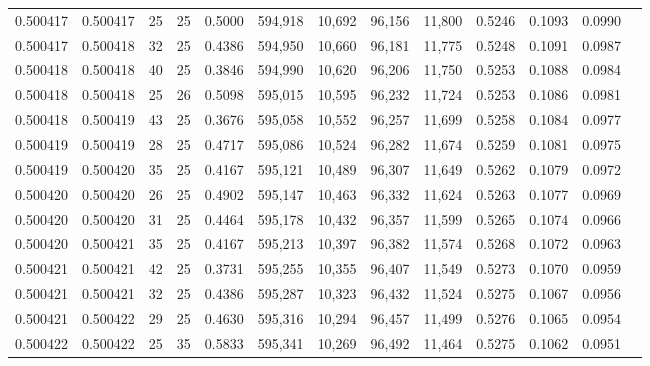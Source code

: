 \begin{tabular}{rrrrrrrrrrrrr}
0.500417 & 0.500417 &    25 &  25 &                                     0.5000 & 594,918 &  10,692 &  96,156 &  11,800 & 0.5246 & 0.1093 & 0.0990 \\
0.500417 & 0.500418 &    32 &  25 &                                     0.4386 & 594,950 &  10,660 &  96,181 &  11,775 & 0.5248 & 0.1091 & 0.0987 \\
0.500418 & 0.500418 &    40 &  25 &                                     0.3846 & 594,990 &  10,620 &  96,206 &  11,750 & 0.5253 & 0.1088 & 0.0984 \\
0.500418 & 0.500418 &    25 &  26 &                                     0.5098 & 595,015 &  10,595 &  96,232 &  11,724 & 0.5253 & 0.1086 & 0.0981 \\
0.500418 & 0.500419 &    43 &  25 &                                     0.3676 & 595,058 &  10,552 &  96,257 &  11,699 & 0.5258 & 0.1084 & 0.0977 \\
0.500419 & 0.500419 &    28 &  25 &                                     0.4717 & 595,086 &  10,524 &  96,282 &  11,674 & 0.5259 & 0.1081 & 0.0975 \\
0.500419 & 0.500420 &    35 &  25 &                                     0.4167 & 595,121 &  10,489 &  96,307 &  11,649 & 0.5262 & 0.1079 & 0.0972 \\
0.500420 & 0.500420 &    26 &  25 &                                     0.4902 & 595,147 &  10,463 &  96,332 &  11,624 & 0.5263 & 0.1077 & 0.0969 \\
0.500420 & 0.500420 &    31 &  25 &                                     0.4464 & 595,178 &  10,432 &  96,357 &  11,599 & 0.5265 & 0.1074 & 0.0966 \\
0.500420 & 0.500421 &    35 &  25 &                                     0.4167 & 595,213 &  10,397 &  96,382 &  11,574 & 0.5268 & 0.1072 & 0.0963 \\
0.500421 & 0.500421 &    42 &  25 &                                     0.3731 & 595,255 &  10,355 &  96,407 &  11,549 & 0.5273 & 0.1070 & 0.0959 \\
0.500421 & 0.500421 &    32 &  25 &                                     0.4386 & 595,287 &  10,323 &  96,432 &  11,524 & 0.5275 & 0.1067 & 0.0956 \\
0.500421 & 0.500422 &    29 &  25 &                                     0.4630 & 595,316 &  10,294 &  96,457 &  11,499 & 0.5276 & 0.1065 & 0.0954 \\
0.500422 & 0.500422 &    25 &  35 &                                     0.5833 & 595,341 &  10,269 &  96,492 &  11,464 & 0.5275 & 0.1062 & 0.0951 \\

\end{tabular}
